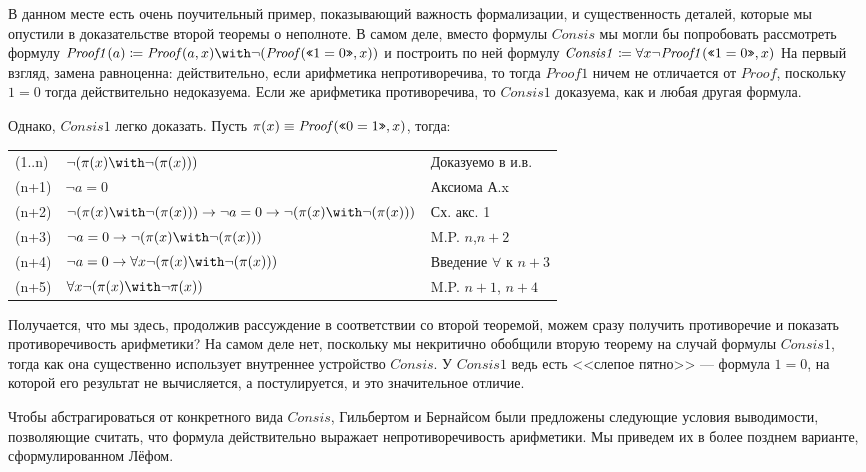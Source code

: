 В данном месте есть очень поучительный пример, показывающий важность 
формализации, и существенность деталей, которые мы опустили в доказательстве
второй теоремы о неполноте. В самом деле, вместо формулы $\mathit{Consis}$ мы могли бы 
попробовать рассмотреть формулу 
$\mathit{Proof1}(a) \coloneqq  \mathit{Proof} (a,x) \with \neg(\mathit{Proof} (\gq{1=0},x))$
и построить по ней формулу
$\mathit{Consis1} \coloneqq  \forall x \neg \mathit{Proof1} (\texttt{<<}1=0\texttt{>>},x)$ 
На первый взгляд, замена равноценна: действительно, 
если арифметика непротиворечива, то тогда $\mathit{Proof1}$ ничем не отличается от $\mathit{Proof}$,
поскольку $1=0$ тогда действительно недоказуема. Если же арифметика противоречива,
то $\mathit{Consis1}$ доказуема, как и любая другая формула.

Однако, $\mathit{Consis1}$ легко доказать. Пусть $\pi(x) \equiv \mathit{Proof}(\texttt{<<}0=1\texttt{>>},x)$, тогда:

\begin{tabular}{lll}
(1..n) & $\neg (\pi(x) \with \neg (\pi(x)))$ & Доказуемо в и.в.\\
(n+1) & $\neg a=0$ & Аксиома А.x\\
(n+2) & $\neg (\pi(x) \with \neg (\pi(x))) \rightarrow \neg a=0 \rightarrow \neg (\pi(x) \with \neg (\pi(x)))$ & Сх. акс. 1\\
(n+3) & $\neg a=0 \rightarrow \neg (\pi(x) \with \neg (\pi(x)))$ & M.P. $n$,$n+2$\\
(n+4) & $\neg a=0 \rightarrow \forall x \neg (\pi(x) \with \neg (\pi(x)))$ & Введение $\forall$ к $n+3$\\
(n+5) & $\forall x \neg (\pi(x) \with \neg \pi(x))$ & M.P. $n+1$, $n+4$
\end{tabular}

Получается, что мы здесь, продолжив рассуждение в соответствии со второй теоремой,
можем сразу получить противоречие и показать противоречивость арифметики?
На самом деле нет, поскольку мы некритично обобщили вторую теорему на 
случай формулы $\mathit{Consis1}$, тогда как она существенно использует внутреннее устройство $\mathit{Consis}$. 
У $\mathit{Consis1}$ ведь есть <<слепое пятно>> --- формула $1=0$, на которой его результат не вычисляется,
а постулируется, и это значительное отличие. 

Чтобы абстрагироваться от конкретного вида $\mathit{Consis}$, Гильбертом и Бернайсом были
предложены следующие условия выводимости, позволяющие считать, что формула действительно
выражает непротиворечивость арифметики. Мы приведем их в более позднем варианте,
сформулированном Лёфом.

